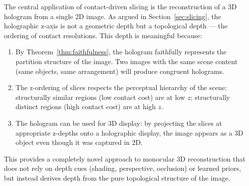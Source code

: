 \documentclass[twocolumn]{article}
\theoremstyle{plain}
\theoremstyle{definition}
\begin{document}
The central application of contact-driven slicing is the reconstruction of a
3D hologram from a single 2D image. As argued in Section~\ref{sec:slicing}, the
holographic z-axis is not a geometric depth but a topological depth --- the
ordering of contact resolutions. This depth is meaningful because:

\begin{enumerate}[label=(\roman*)]
\item By Theorem~\ref{thm:faithfulness}, the hologram faithfully represents the
  partition structure of the image. Two images with the same scene content (same
  objects, same arrangement) will produce congruent holograms.

\item The z-ordering of slices respects the perceptual hierarchy of the scene:
  structurally similar regions (low contact cost) are at low $z$; structurally
  distinct regions (high contact cost) are at high $z$.

\item The hologram can be used for 3D display: by projecting the slices at
  appropriate z-depths onto a holographic display, the image appears as a 3D
  object even though it was captured in 2D.
\end{enumerate}

This provides a completely novel approach to monocular 3D reconstruction that does
not rely on depth cues (shading, perspective, occlusion) or learned priors, but
instead derives depth from the pure topological structure of the image.
\end{document}

